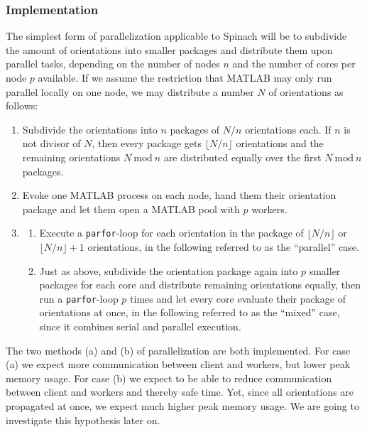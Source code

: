 \documentclass[11.5pt,a4paper]{article}
\begin{document}
\subsubsection{Implementation}
The simplest form of parallelization applicable to Spinach will be to subdivide the amount of orientations into smaller packages and distribute them upon parallel tasks, depending on the number of nodes $n$ and the number of cores per node $p$ available. If we assume the restriction that MATLAB may only run parallel locally on one node, we may distribute a number $N$ of orientations as follows:
\begin{enumerate}
 \item Subdivide the orientations into $n$ packages of $N/n$ orientations each. If $n$ is not divisor of $N$, then every package gets $\lfloor N/n \rfloor$ orientations and the remaining orientations $N\ \text{mod}\ n$ are distributed equally over the first $N\ \text{mod}\ n$ packages.
 \item Evoke one MATLAB process on each node, hand them their orientation package and let them open a MATLAB pool with $p$ workers.
 \item { \begin{enumerate}
          \item Execute a \verb$parfor$-loop for each orientation in the package of $\lfloor N/n \rfloor$ or $\lfloor N/n \rfloor + 1$ orientations, in the following referred to as the ``parallel'' case. 
	  \item Just as above, subdivide the orientation package again into $p$ smaller packages for each core and distribute remaining orientations equally, then run a \verb$parfor$-loop $p$ times and let every core evaluate their package of orientations at once, in the following referred to as the ``mixed'' case, since it combines serial and parallel execution.
         \end{enumerate} }
\end{enumerate}

The two methods (a) and (b) of parallelization are both implemented. For case (a) we expect more communication between client and workers, but lower peak memory usage. For case (b) we expect to be able to reduce communication between client and workers and thereby safe time. Yet, since all orientations are propagated at once, we expect much higher peak memory usage. We are going to investigate this hypothesis later on.
\end{document}
